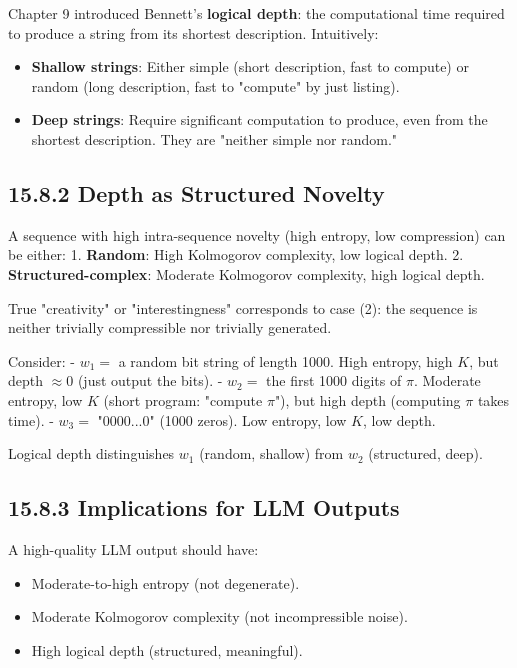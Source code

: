 Chapter 9 introduced Bennett's \textbf{logical depth}: the computational time required to produce a string from its shortest description. Intuitively:

\begin{itemize}
\item \textbf{Shallow strings}: Either simple (short description, fast to compute) or random (long description, fast to "compute" by just listing).
\item \textbf{Deep strings}: Require significant computation to produce, even from the shortest description. They are "neither simple nor random."
\end{itemize}

\subsection{15.8.2 Depth as Structured Novelty}

\begin{proposition}[Informal]
A sequence with high intra-sequence novelty (high entropy, low compression) can be either:
1. \textbf{Random}: High Kolmogorov complexity, low logical depth.
2. \textbf{Structured-complex}: Moderate Kolmogorov complexity, high logical depth.

True "creativity" or "interestingness" corresponds to case (2): the sequence is neither trivially compressible nor trivially generated.
\end{proposition}

\begin{example}
Consider:
- $w_1 = $ a random bit string of length 1000. High entropy, high $K$, but depth $\approx 0$ (just output the bits).
- $w_2 = $ the first 1000 digits of $\pi$. Moderate entropy, low $K$ (short program: "compute $\pi$"), but high depth (computing $\pi$ takes time).
- $w_3 = $ "0000...0" (1000 zeros). Low entropy, low $K$, low depth.

Logical depth distinguishes $w_1$ (random, shallow) from $w_2$ (structured, deep).
\end{example}

\subsection{15.8.3 Implications for LLM Outputs}

A high-quality LLM output should have:
\begin{itemize}
\item Moderate-to-high entropy (not degenerate).
\item Moderate Kolmogorov complexity (not incompressible noise).
\item High logical depth (structured, meaningful).
\end{itemize}

